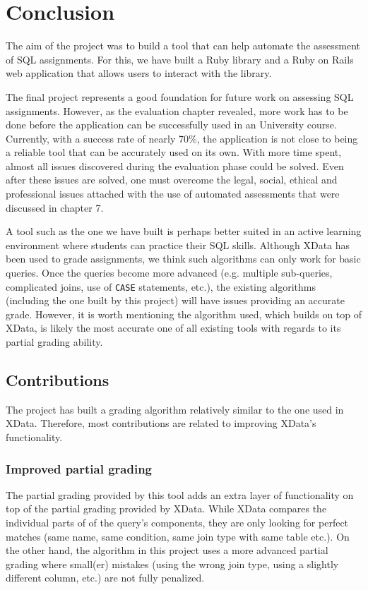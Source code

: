 \chapter{Conclusion}

The aim of the project was to build a tool that can help automate the assessment of SQL assignments. For this, we have built a Ruby library and a Ruby on Rails web application that allows users to interact with the library. 

The final project represents a good foundation for future work on assessing SQL assignments. However, as the evaluation chapter revealed, more work has to be done before the application can be successfully used in an University course. Currently, with a success rate of nearly 70\%, the application is not close to being a reliable tool that can be accurately used on its own. With more time spent, almost all issues discovered during the evaluation phase could be solved. Even after these issues are solved, one must overcome the legal, social, ethical and professional issues attached with the use of automated assessments that were discussed in chapter 7.

A tool such as the one we have built is perhaps better suited in an active learning environment where students can practice their SQL skills. Although XData has been used to grade assignments, we think such algorithms can only work for basic queries. Once the queries become more advanced (e.g. multiple sub-queries, complicated joins, use of \texttt{CASE} statements, etc.), the existing algorithms (including the one built by this project) will have issues providing an accurate grade. However, it is worth mentioning the algorithm used, which builds on top of XData, is likely the most accurate one of all existing tools with regards to its partial grading ability.

\section{Contributions}
The project has built a grading algorithm relatively similar to the one used in XData. Therefore, most contributions are related to improving XData's functionality.

\subsection{Improved partial grading}
The partial grading provided by this tool adds an extra layer of functionality on top of the partial grading provided by XData. While XData compares the individual parts of of the query's components, they are only looking for perfect matches (same name, same condition, same join type with same table etc.). On the other hand, the algorithm in this project uses a more advanced partial grading where small(er) mistakes (using the wrong join type, using a slightly different column, etc.) are not fully penalized. 

